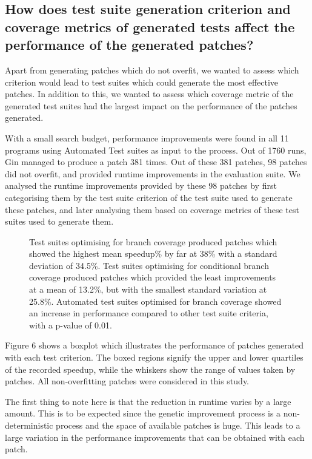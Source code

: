 \documentclass[titlepage]{article}
\begin{document}
\subsection{How does test suite generation criterion and coverage metrics of generated tests affect the performance of the generated patches?}

Apart from generating patches which do not overfit, we wanted to assess which criterion would lead to test suites which could generate the most effective patches. In addition to this, we wanted to assess which coverage metric of the generated test suites had the largest impact on the performance of the patches generated. 

With a small search budget, performance improvements were found in all 11 programs using Automated Test suites as input to the process. Out of 1760 runs, Gin managed to produce a patch 381 times. Out of these 381 patches, 98 patches did not overfit, and provided runtime improvements in the evaluation suite. We analysed the runtime improvements provided by these 98 patches by first categorising them by the test suite criterion of the test suite used to generate these patches, and later analysing them based on coverage metrics of these test suites used to generate them.

\begin{figure}
    \begin{center}
        \resizebox{0.8\textwidth}{!}{}
    \end{center}
    \caption{Test suites optimising for branch coverage produced patches which showed the highest mean speedup\% by far at 38\% with a standard deviation of 34.5\%.  Test suites optimising for conditional branch coverage produced patches which provided the least improvements at a mean of 13.2\%, but with the smallest standard variation at 25.8\%. Automated test suites optimised for branch coverage showed an increase in performance compared to other test suite criteria, with a p-value of 0.01.
}
\end{figure}

Figure 6 shows a boxplot which illustrates the performance of patches generated with each test criterion. The boxed regions signify the upper and lower quartiles of the recorded speedup, while the whiskers show the range of values taken by patches. All non-overfitting patches were considered in this study.

The first thing to note here is that the reduction in runtime varies by a large amount. This is to be expected since the genetic improvement process is a non-deterministic process and the space of available patches is huge. This leads to a large variation in the performance improvements that can be obtained with each patch.
\end{document}
